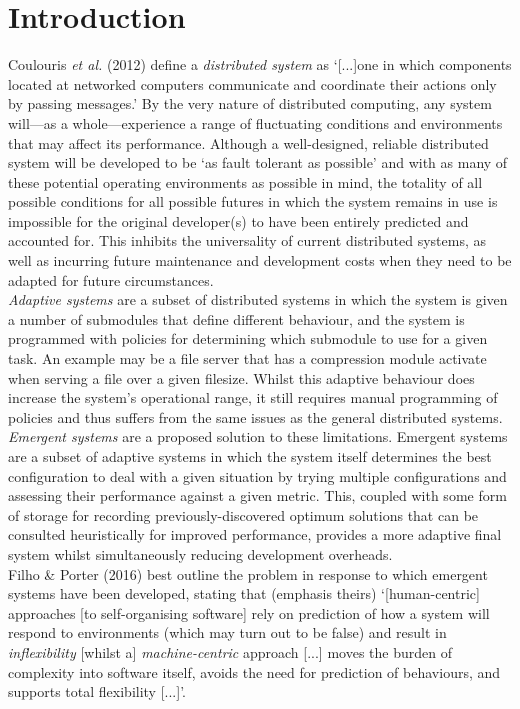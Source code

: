 \documentclass[compsoc,12pt,a4paper]{IEEEtran}
\begin{document}
	\newpage
	
	\section{Introduction}
	\label{sec:introduction}
	
		Coulouris \textit{et al.} (2012) define a \textit{distributed system} as `[...]one in which components located at networked computers communicate and coordinate their actions only by passing messages.'\cite{distsys} By the very nature of distributed computing, any system will---as a whole---experience a range of fluctuating conditions and environments that may affect its performance. Although a well-designed, reliable distributed system will be developed to be `as fault tolerant as possible'\cite{reliable} and with as many of these potential operating environments as possible in mind, the totality of all possible conditions for all possible futures in which the system remains in use is impossible for the original developer(s) to have been entirely predicted and accounted for. This inhibits the universality of current distributed systems, as well as incurring future maintenance and development costs when they need to be adapted for future circumstances.\\
		\textit{Adaptive systems} are a subset of distributed systems in which the system is given a number of submodules that define different behaviour, and the system is programmed with policies for determining which submodule to use for a given task. An example may be a file server that has a compression module activate when serving a file over a given filesize. Whilst this adaptive behaviour does increase the system's operational range, it still requires manual programming of policies and thus suffers from the same issues as the general distributed systems.\\
		\textit{Emergent systems} are a proposed solution to these limitations. Emergent systems are a subset of adaptive systems in which the system itself determines the best configuration to deal with a given situation by trying multiple configurations and assessing their performance against a given metric. This, coupled with some form of storage for recording previously-discovered optimum solutions that can be consulted heuristically for improved performance, provides a more adaptive final system whilst simultaneously reducing development overheads.\\
		Filho \& Porter (2016) best outline the problem in response to which emergent systems have been developed, stating that (emphasis theirs) `[human-centric] approaches [to self-organising software] rely on prediction of how a system will respond to environments (which may turn out to be false) and result in \textit{inflexibility} [whilst a] \textit{machine-centric} approach [...] moves the burden of complexity into software itself, avoids the need for prediction of behaviours, and supports total flexibility [...]'.\cite{machinecentric}\\
\end{document}
